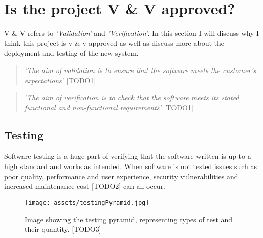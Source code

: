 \section{Is the project V \& V approved?}
  V \& V refers to \textit{'Validation'} and \textit{'Verification'}. In this section I will discuss why I think this project is v \&
  v approved as well as discuss more about the deployment and testing of the new system.

  \begin{quote}
    \textit{'The aim of validation is to ensure that the software meets the customer's expectations'} [TODO1]
  \end{quote}

  \begin{quote}
    \textit{'The aim of verification is to check that the software meets its stated functional and non-functional requirements'} [TODO1]
  \end{quote}

  \subsection{Testing}

  Software testing is a huge part of verifying that the software written is up to a high standard and works as intended. When software is not
  tested issues such as poor quality, performance and user experience, security vulnerabilities and increased maintenance cost [TODO2] can all 
  occur.

  \begin{figure}[H]
    \centering
    \texttt{[image: assets/testingPyramid.jpg]}
    \caption{Image showing the testing pyramid, representing types of test and their quantity. [TODO3]}
    \label{fig:testingPyramid}
  \end{figure}

